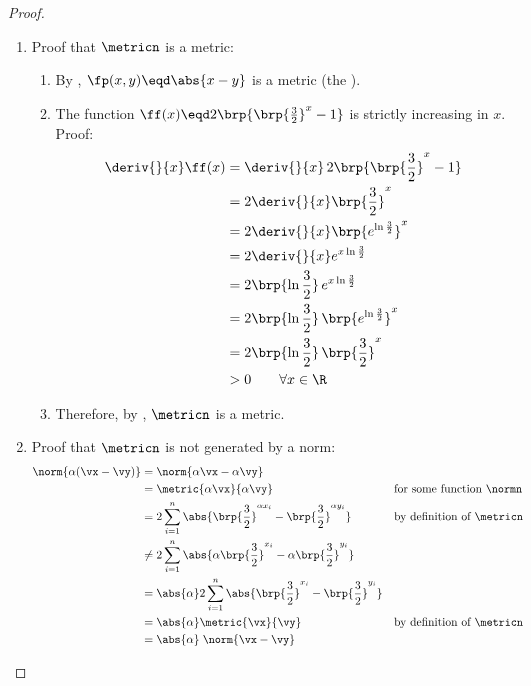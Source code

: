 {\begin{proof}
\begin{enumerate}
  \item Proof that $\metricn$ is a metric:
    \begin{enumerate}
      \item By , $\fp(x,y)\eqd \abs{x-y}$ is a metric (the ). 
      \item The function $\ff(x)\eqd 2\brp{\brp{\frac{3}{2}}^x - 1}$ is strictly increasing in $x$. Proof:
        \begin{align*}
          \deriv{}{x} \ff(x)
            &= \deriv{}{x}\, 2\brp{\brp{\frac{3}{2}}^x - 1}
          \\&= 2 \deriv{}{x} \brp{\frac{3}{2}}^x
          \\&= 2 \deriv{}{x} \brp{e^{\ln\frac{3}{2}}}^x
          \\&= 2 \deriv{}{x} e^{x\ln\frac{3}{2}}
          \\&= 2 \brp{\ln\frac{3}{2}}\,e^{x\ln\frac{3}{2}}
          \\&= 2 \brp{\ln\frac{3}{2}}\,\brp{e^{\ln\frac{3}{2}}}^x
          \\&= 2 \brp{\ln\frac{3}{2}}\,\brp{\frac{3}{2}}^x
          \\&> 0 \qquad \forall x\in\R
        \end{align*}
      \item Therefore, by , $\metricn$ is a metric.
    \end{enumerate}

  \item Proof that $\metricn$ is not generated by a norm:
    \begin{align*}
      \norm{\alpha(\vx-\vy)}
        &= \norm{\alpha\vx-\alpha\vy}
      \\&= \metric{\alpha\vx}{\alpha\vy}
        && \text{for some function $\normn$}
      \\&= 2\sum_{i=1}^n  \abs{\brp{\frac{3}{2}}^{\alpha x_i} - \brp{\frac{3}{2}}^{\alpha y_i}}
        && \text{by definition of $\metricn$}
      \\&\ne  2\sum_{i=1}^n  \abs{\alpha \brp{\frac{3}{2}}^{x_i} - \alpha \brp{\frac{3}{2}}^{y_i}}
      \\&= \abs{\alpha}2\sum_{i=1}^n  \abs{\brp{\frac{3}{2}}^{x_i} -  \brp{\frac{3}{2}}^{y_i}}
      \\&= \abs{\alpha} \metric{\vx}{\vy}
        && \text{by definition of $\metricn$}
      \\&= \abs{\alpha}\;\norm{\vx-\vy}
    \end{align*}


\end{enumerate}
\end{proof}}
